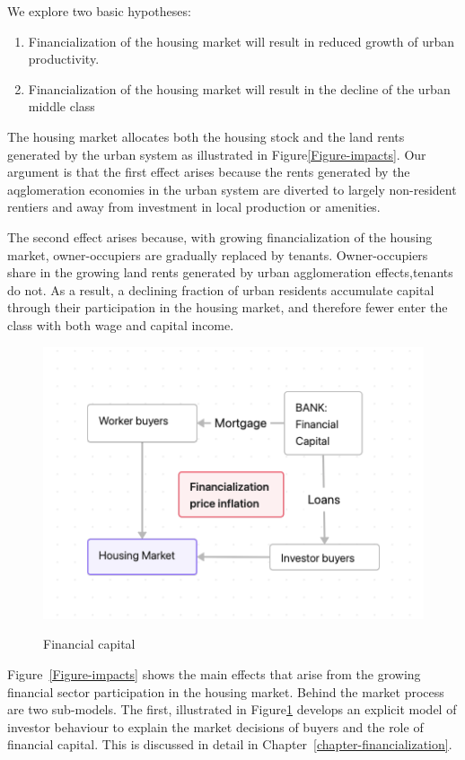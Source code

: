We explore two basic hypotheses:
\begin{enumerate}
    \item Financialization of the housing market will result in reduced  growth of urban productivity.
    \item Financialization of the housing market will result in the decline of the urban middle class
\end{enumerate}

The housing market allocates both the housing stock and the land \glspl{rent} generated by the urban system as illustrated in Figure\ref{Figure-impacts}. Our argument is that the first effect arises because the rents generated by the aqglomeration economies in the urban system are diverted to largely non-resident \glspl{rentier} and away from investment in local production or amenities. 

The second effect arises because, with growing financialization of the housing market, owner-occupiers are gradually replaced by tenants.  Owner-occupiers share in the growing land rents generated by urban agglomeration effects,tenants do not. As a result, a declining fraction of urban residents  accumulate capital through their participation in the housing market, and therefore fewer enter the class with both wage and capital income. 

\begin{figure}[h!]
    \centering
    \includegraphics[scale=.70]{fig/flow_financialization.png}
    \label{Fig-financial-cycle}
    \caption{Financial capital}
\end{figure}



Figure~\ref{Figure-impacts} shows the main effects  that  arise from the growing financial sector participation in the housing market. Behind the market process are two sub-models. The first, illustrated in Figure\ref{Fig-financial-cycle}  develops an explicit model of investor behaviour to explain the market decisions of buyers and the role of financial capital. This is discussed in detail in Chapter~\ref{chapter-financialization}.

